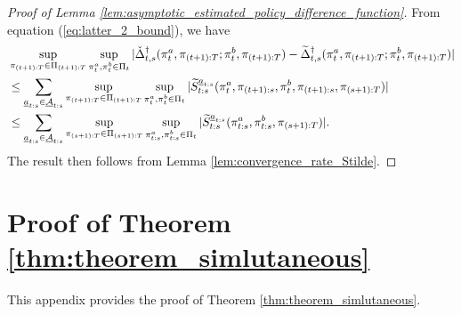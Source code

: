\begin{proof}[Proof of  Lemma \ref{lem:asymptotic_estimated_policy_difference_function}]
From equation (\ref{eq:latter_2_bound}), we have 
\begin{align*}
    &\sup_{\pi_{(t+1):T} \in \Pi_{(t+1):T}} \sup_{\pi_{t}^{a},\pi_{t}^{b} \in \Pi_{t}} |\check{\Delta}_{t,s}^{\dagger}(\pi_{t}^{a},\pi_{(t+1):T};\pi_{t}^{b},\pi_{(t+1):T}) - \widetilde{\Delta}_{t,s}^{\dagger}(\pi_{t}^{a},\pi_{(t+1):T};\pi_{t}^{b},\pi_{(t+1):T})| \nonumber \\
     &\leq \sum_{\underline{a}_{t:s} \in \underline{\mathcal{A}}_{t:s}} \sup_{\pi_{(t+1):T} \in \Pi_{(t+1):T}} \sup_{\pi_{t}^{a},\pi_{t}^{b} \in \Pi_{t}} |\widetilde{S}_{t:s}^{\underline{a}_{t:s}}(\pi_{t}^{a},\pi_{(t+1):s},\pi_{t}^{b},\pi_{(t+1):s},\pi_{(s+1):T})|\\
      &\leq \sum_{\underline{a}_{t:s} \in \underline{\mathcal{A}}_{t:s}} \sup_{\pi_{(s+1):T} \in \Pi_{(s+1):T}} \sup_{\pi_{t:s}^{a},\pi_{t:s}^{b} \in \Pi_{t}} |\widetilde{S}_{t:s}^{\underline{a}_{t:s}}(\pi_{t:s}^{a},\pi_{t:s}^{b},\pi_{(s+1):T})|.
\end{align*}
The result then follows from Lemma \ref{lem:convergence_rate_Stilde}.
\end{proof}


\setcounter{equation}{0}
\renewcommand{\theequation}{C.\arabic{equation}}

\section{Proof of Theorem \ref{thm:theorem_simlutaneous}}
\label{app:statistical_property_AIPW}

This appendix provides the proof of Theorem \ref{thm:theorem_simlutaneous}.

\medskip

